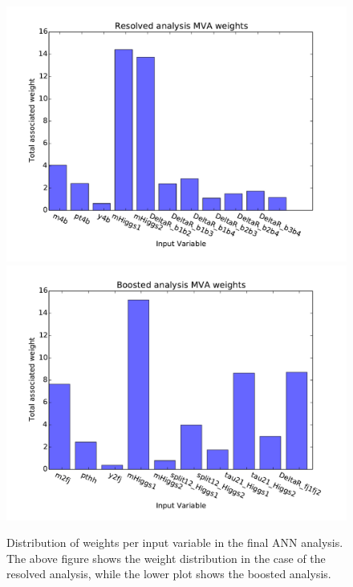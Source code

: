 \begin{figure}[h]
\begin{center}
\includegraphics[width=1\textwidth]{plots/nnweights_res.pdf}
\includegraphics[width=1\textwidth]{plots/nnweights_boost.pdf}
\caption{Distribution of weights per input variable in the final ANN analysis. The above figure shows the weight distribution in the case of the resolved analysis, while the lower plot shows the boosted analysis.}
\label{fig:nnweights}
\end{center}
\end{figure}
\clearpage

